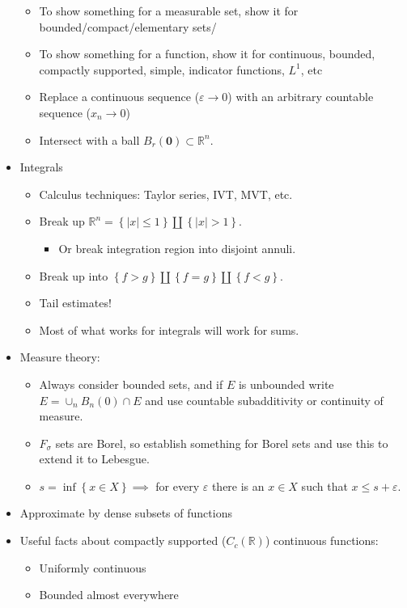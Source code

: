 \begin{itemize}
  \begin{itemize}
  \tightlist
  \item
    To show something for a measurable set, show it for
    bounded/compact/elementary sets/
  \item
    To show something for a function, show it for continuous, bounded,
    compactly supported, simple, indicator functions, \(L^1\), etc
  \item
    Replace a continuous sequence (\(\varepsilon\to 0\)) with an
    arbitrary countable sequence (\(x_n \to 0\))
  \item
    Intersect with a ball \(B_r(\mathbf{0})\subset {\mathbb{R}}^n\).
  \end{itemize}
\item
  Integrals

  \begin{itemize}
  \tightlist
  \item
    Calculus techniques: Taylor series, IVT, MVT, etc.
  \item
    Break up
    \({\mathbb{R}}^n = \left\{{{\left\lvert {x} \right\rvert} \leq 1}\right\} \coprod \left\{{{\left\lvert {x} \right\rvert} > 1}\right\}\).

    \begin{itemize}
    \tightlist
    \item
      Or break integration region into disjoint annuli.
    \end{itemize}
  \item
    Break up into
    \(\left\{{f>g}\right\} {\coprod}\left\{{f=g}\right\} {\coprod}\left\{{f< g}\right\}\).
  \item
    Tail estimates!
  \item
    Most of what works for integrals will work for sums.
  \end{itemize}
\item
  Measure theory:

  \begin{itemize}
  \item
    Always consider bounded sets, and if \(E\) is unbounded write
    \(E = \cup_{n} B_{n}(0) \cap E\) and use countable subadditivity or
    continuity of measure.
  \item
    \(F_\sigma\) sets are Borel, so establish something for Borel sets
    and use this to extend it to Lebesgue.
  \item
    \(s = \inf\left\{{x\in X}\right\} \implies\) for every
    \(\varepsilon\) there is an \(x\in X\) such that
    \(x \leq s + \varepsilon\).
  \end{itemize}
\item
  Approximate by dense subsets of functions
\item
  Useful facts about compactly supported (\(C_c({\mathbb{R}})\))
  continuous functions:

  \begin{itemize}
  \tightlist
  \item
    Uniformly continuous
  \item
    Bounded almost everywhere
  \end{itemize}
\end{itemize}

